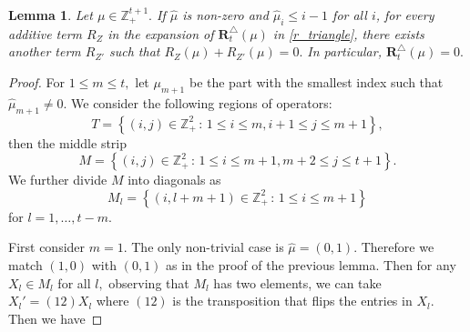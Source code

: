 \documentclass[11pt]{amsart}
\newtheorem{lemma}[theorem]{Lemma}
\begin{document}
\begin{lemma} \label{alleq}
Let $\mu \in \mathbb{Z}_+^{t+1}.$ If $  \hat{\mu}$ is non-zero and $\hat{\mu}_i \leq i-1$ for all $i$, for every additive term $R_Z$ in the expansion of $\mathbf{R}_{t}^{\triangle}(\mu)$ in \eqref{r_triangle}, there exists another term $R_{Z'}$ such that $R_{Z}(\mu)+R_{Z'}(\mu)=0.$ In particular, $\mathbf{R}_{t}^{\triangle}(\mu)=0.$ 
\end{lemma}
\begin{proof}
    For $1 \leq m \leq t,$ let $\mu_{m+1}$ be the part with the smallest index such that $\hat{\mu}_{m+1} \neq 0.$ We consider the following regions of operators:
\[T= \left\{ (i,j) \in \mathbb{Z}^2_{+} \, : \,  1 \leq i \leq m , i+1 \leq j \leq m+1 \right\}, \]
then the middle strip
\[M= \left\{ (i,j) \in \mathbb{Z}^2_{+} \, : \,  1 \leq i \leq m+1 , m+2 \leq j \leq t+1 \right\}. \]
We further divide $M$ into diagonals as
\[M_l=\left\{ (i,l+m+1) \in \mathbb{Z}^2_{+} \, : \,  1 \leq i \leq m+1 \right\}\]
for $l=1,\ldots, t-m.$  

\begin{figure}[h!]
\end{figure}


\noindent First consider $m=1.$ The only non-trivial case is $\hat{\mu}=(0,1).$ Therefore we match $(1,0)$ with $(0,1)$ as in the proof of the previous lemma. Then for any $X_l \in M_l$ for all $l,$ observing that $M_l$ has two elements, we can take $X_l'=(1 2) X_l$ where $(1 2)$ is the transposition that flips the entries in $X_l$. Then we have   


\end{proof}
\end{document}
